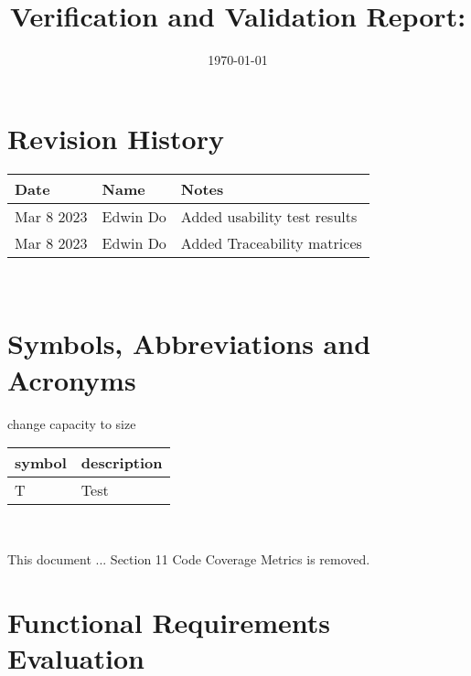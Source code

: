 \documentclass[12pt, titlepage]{article}
\begin{document}
\title{Verification and Validation Report: \progname} 
\author{\authname}
\date{\today}
	
\maketitle


\section{Revision History}

\begin{tabularx}{\textwidth}{p{3cm}p{2cm}X}
\toprule {\bf Date} & {\bf Name} & {\bf Notes}\\
\midrule
Mar 8 2023 & Edwin Do & Added usability test results \\
Mar 8 2023 & Edwin Do & Added Traceability matrices \\
\bottomrule
\end{tabularx}

~\newpage

\section{Symbols, Abbreviations and Acronyms}
change capacity to size

\renewcommand{\arraystretch}{1.2}
\begin{tabular}{l l} 
  \toprule		
  \textbf{symbol} & \textbf{description}\\
  \midrule 
  T & Test\\
  \bottomrule
\end{tabular}\\


\newpage

\tableofcontents

\listoftables %

\listoffigures %

\newpage


This document ...
Section 11 Code Coverage Metrics is removed.

\section{Functional Requirements Evaluation}
\end{document}
